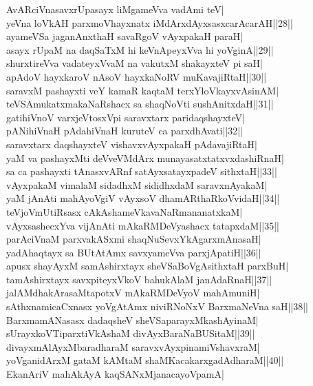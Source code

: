 \documentclass{article}
\begin{document}
AvARciVnasavxrUpasayx liMgameVva vadAmi teV|\\
yeVna loVkAH parxmoVhayxnatx iMdArxdAyxsasxcarAcarAH||28||\\
ayameVSa jaganAnxthaH savaRgoV vAyxpakaH paraH|\\
asayx rUpaM na daqSaTxM hi keVnApeyxVva hi yoVginA||29||\\
shurxtireVva vadateyxVvaM na vakutxM shakayxteV pi saH|\\
apAdoV hayxkaroV nAsoV hayxkaNoRV muKavajiRtaH||30||\\
saravxM pashayxti veY kamaR kaqtaM terxYloVkayxvAsinAM|\\
teVSAmukatxmakaNaRshacx sa shaqNoVti sushAnitxdaH||31||\\
gatihiVnoV varxjeVtosxVpi saravxtarx paridaqshayxteV|\\
pANihiVnaH pAdahiVnaH kuruteV ca parxdhAvati||32||\\
saravxtarx daqshayxteV vishavxvAyxpakaH pAdavajiRtaH|\\
yaM va pashayxMti deVveVMdArx munayasatxtatxvxdashiRnaH|\\
sa ca pashayxti tAnasxvARnf satAyxsatayxpadeV sithxtaH||33||\\
vAyxpakaM vimalaM sidadhxM sididhxdaM saravxnAyakaM|\\
yaM jAnAti mahAyoVgiV vAyxsoV dhamARthaRkoVvidaH||34||\\
teVjoVmUtiRsasx cAkAshameVkavaNaRmananatxkaM|\\
vAyxsashecxYva vijAnAti mAkaRMDeVyashacx tatapxdaM||35||\\
parAciVnaM parxvakASxmi shaqNuSevxYkAgarxmAnasaH|\\
yadAhaqtayx sa BUtAtAmx savxyameVva parxjApatiH||36||\\
apusx shayAyxM samAshirxtayx sheVSaBoVgAsithxtaH parxBuH|\\
tamAshirxtayx savxpiteyxVkoV bahukAlaM janAdaRnaH||37||\\
jalAMdhakArasaMtapotxV mAkaRMDeVyoV mahAmuniH|\\
sAthxnamicaCxnasx yoVgAtAmx niviRNoNxV BarxmaNeVna saH||38||\\
BarxmamANasasx dadaqsheV sheVSaparayxMkashAyinaM|\\
sUrayxkoVTiparxtiVkAshaM divAyxBaraNaBUSitaM||39||\\
divayxmAlAyxMbaradharaM saravxvAyxpinamiVshavxraM|\\
yoVganidArxM gataM kAMtaM shaMKacakarxgadAdharaM||40||\\
EkanAriV mahAkAyA kaqSANxMjanacayoVpamA|\\
\end{document}
